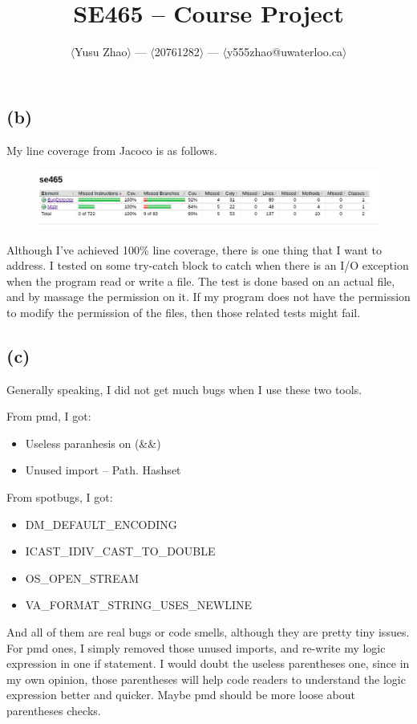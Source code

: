\documentclass[12pt]{article}
\title{SE465 -- Course Project}
\author{$\langle$Yusu Zhao$\rangle$ --- $\langle$20761282$\rangle$ --- $\langle$y555zhao@uwaterloo.ca$\rangle$}
\date{}
\begin{document}
\maketitle
\subsection*{(b)}

My line coverage from Jacoco is as follows.
\begin{figure}[H] %
\centering %
\includegraphics[width=1\textwidth]{jacoco-coverage.png} %
\end{figure}

Although I've achieved 100\% line coverage, there is one thing that I want to address. I tested on some try-catch block to catch when there is an I/O exception when the program read or write a file. The test is done based on an actual file, and by massage the permission on it. If my program does not have the permission to modify the permission of the files, then those related tests might fail. 

\subsection*{(c)}

Generally speaking, I did not get much bugs when I use these two tools. 

From pmd, I got:
\begin{itemize}
	\item Useless paranhesis on (\&\&)
	\item Unused import -- Path. Hashset
\end{itemize}

From spotbugs, I got:
\begin{itemize}
	\item DM\_DEFAULT\_ENCODING
	\item ICAST\_IDIV\_CAST\_TO\_DOUBLE
	\item OS\_OPEN\_STREAM
	\item VA\_FORMAT\_STRING\_USES\_NEWLINE
\end{itemize}

And all of them are real bugs or code smells, although they are pretty tiny issues. For pmd ones, I simply removed those unused imports, and re-write my logic expression in one if statement. I would doubt the useless parentheses one, since in my own opinion, those parentheses will help code readers to understand the logic expression better and quicker. Maybe pmd should be more loose about parentheses checks.
\end{document}
